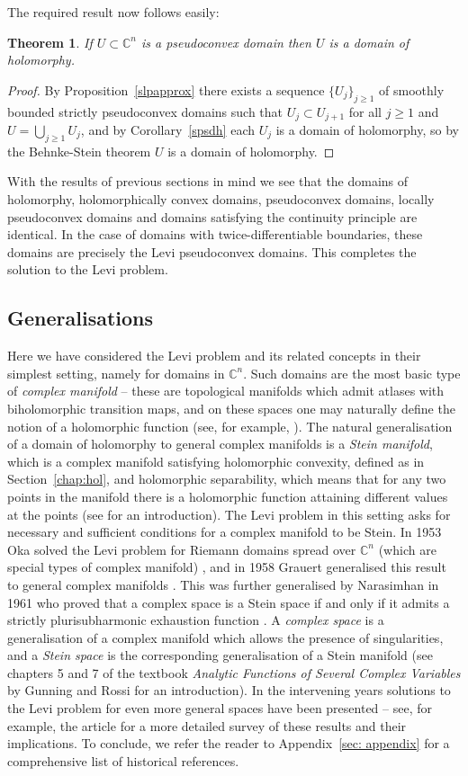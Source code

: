 \documentclass[11pt,a4paper, final, twoside]{article}
\newtheorem{theorem}{Theorem}
\numberwithin{equation}{section}
\newcommand{\C}{\mathbb C}
\begin{document}
The required result now follows easily:
\begin{theorem}
If $U\subset\C^n$ is a pseudoconvex domain then $U$ is a domain of holomorphy.
\end{theorem}
\begin{proof}
By Proposition~\ref{slpapprox} there exists a sequence $\{U_j\}_{j\geq 1}$ of smoothly bounded strictly pseudoconvex domains 
such that $U_j\subset U_{j+1}$ for all $j\geq 1$ and $U=\bigcup_{j\geq 1}U_j$, and by Corollary~\ref{spsdh} each $U_j$ is a domain of holomorphy, so by the Behnke-Stein theorem $U$ is a domain
of holomorphy.
\end{proof}
With the results of previous sections in mind we see that the domains of holomorphy, holomorphically convex domains, 
pseudoconvex domains,
locally pseudoconvex domains and domains satisfying the continuity principle are
identical. In the case of domains with twice-differentiable boundaries, these domains are precisely the Levi pseudoconvex domains. This completes the solution to the Levi problem.
\subsection{Generalisations}
\label{sec:concl}
Here we have considered the Levi problem and its related concepts 
in their simplest setting, namely for domains in $\C^n$. Such domains are the most basic type of \emph{complex manifold} -- these are
topological manifolds which admit atlases with biholomorphic transition maps, and on these spaces one may naturally define the notion of a holomorphic function
(see, for example, \cite[subsection 12]{itca}). The natural generalisation of a domain
of holomorphy to general complex manifolds is a \emph{Stein manifold}, which is a complex manifold satisfying holomorphic convexity, defined as in Section~\ref{chap:hol}, and
holomorphic separability, which means that for any two points in the manifold there is a holomorphic function attaining different values at the points (see \cite[page 223]{itca}
for an introduction).
The Levi problem
in this setting asks for necessary and sufficient conditions for a complex manifold to be Stein. In 1953 Oka solved the Levi problem for Riemann domains spread over $\C^n$ (which are special
types of complex manifold) \cite{oka}, and in 1958 Grauert generalised this result to general complex manifolds \cite{grauert58}.  
This was further generalised by Narasimhan in 1961 who proved that a complex space is a Stein space if and only if it admits a strictly plurisubharmonic exhaustion function \cite{narasimhan}. 
A \emph{complex space} is a generalisation of a complex manifold which allows the presence of singularities, and a \emph{Stein space} is the corresponding generalisation of a Stein manifold (see
chapters 5 and 7 of
the textbook \emph{Analytic Functions of Several Complex Variables} by Gunning and Rossi \cite{gunning} for an introduction). In the intervening years solutions to the Levi problem
for even more general spaces have been presented -- see, for example, the article \cite{siu} for a more detailed survey of these results and their implications. To conclude, we refer the reader to 
Appendix~\ref{sec: appendix} for a comprehensive list of historical references.
\end{document}
